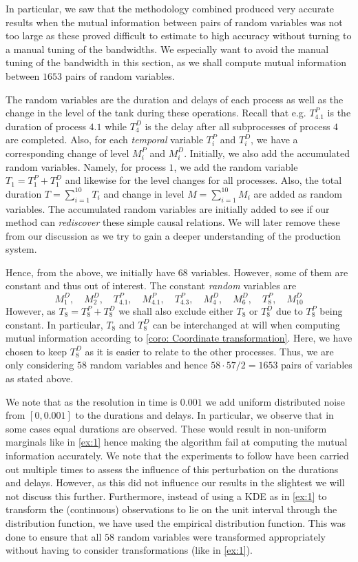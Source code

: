 \documentclass[../Thesis.tex]{subfiles}
\begin{document}
In particular, we saw that the methodology combined produced very accurate results when the mutual information between pairs of random variables was not too large as these proved difficult to estimate to high accuracy without turning to a manual tuning of the bandwidths. We especially want to avoid the manual tuning of the bandwidth in this section, as we shall compute mutual information between $1653$ pairs of random variables.

The random variables are the duration and delays of each process as well as the change in the level of the tank during these operations. Recall that e.g. $T^P_{4.1}$ is the duration of process $4.1$ while $T^D_{4}$ is the delay after all subprocesses of process $4$ are completed. Also, for each \textit{temporal} variable $T^P_i$ and $T^D_i$, we have a corresponding change of level $M^P_i$ and $M^D_i$. Initially, we also add the accumulated random variables. Namely, for process $1$, we add the random variable $T_1 = T^P_1 + T^D_1$ and likewise for the level changes for all processes. Also, the total duration $T = \sum_{i=1}^{10} T_i$ and change in level $M = \sum_{i=1}^{10} M_i$ are added as random variables. The accumulated random variables are initially added to see if our method can \textit{rediscover} these simple causal relations. We will later remove these from our discussion as we try to gain a deeper understanding of the production system.

Hence, from the above, we initially have $68$ variables. However, some of them are constant and thus out of interest. The constant \textit{random} variables are
$$M^D_1,\quad  M^D_2,\quad T^P_{4.1},\quad  M^P_{4.1},\quad T^P_{4.3},\quad  M^D_4,\quad  M^D_6,\quad  T^P_8,\quad  M^D_{10}$$
However, as $T_8 = T^P_8 + T^D_8$ we shall also exclude either $T_8$ or $T^D_8$ due to $T^P_8$ being constant. In particular, $T_8$ and $T^D_8$ can be interchanged at will when computing mutual information according to \autoref{coro: Coordinate transformation}. Here, we have chosen to keep $T^D_8$ as it is easier to relate to the other processes. Thus, we are only considering $58$ random variables and hence $58 \cdot 57 / 2 = 1653$ pairs of variables as stated above.

We note that as the resolution in time is $0.001$ we add uniform distributed noise from $[0,0.001]$ to the durations and delays. In particular, we observe that in some cases equal durations are observed. These would result in non-uniform marginals like in \autoref{ex:1} hence making the algorithm fail at computing the mutual information accurately. We note that the experiments to follow have been carried out multiple times to assess the influence of this perturbation on the durations and delays. However, as this did not influence our results in the slightest we will not discuss this further. Furthermore, instead of using a KDE as in \autoref{ex:1} to transform the (continuous) observations to lie on the unit interval through the distribution function, we have used the empirical distribution function. This was done to ensure that all $58$ random variables were transformed appropriately without having to consider transformations (like in \autoref{ex:1}).
\end{document}
